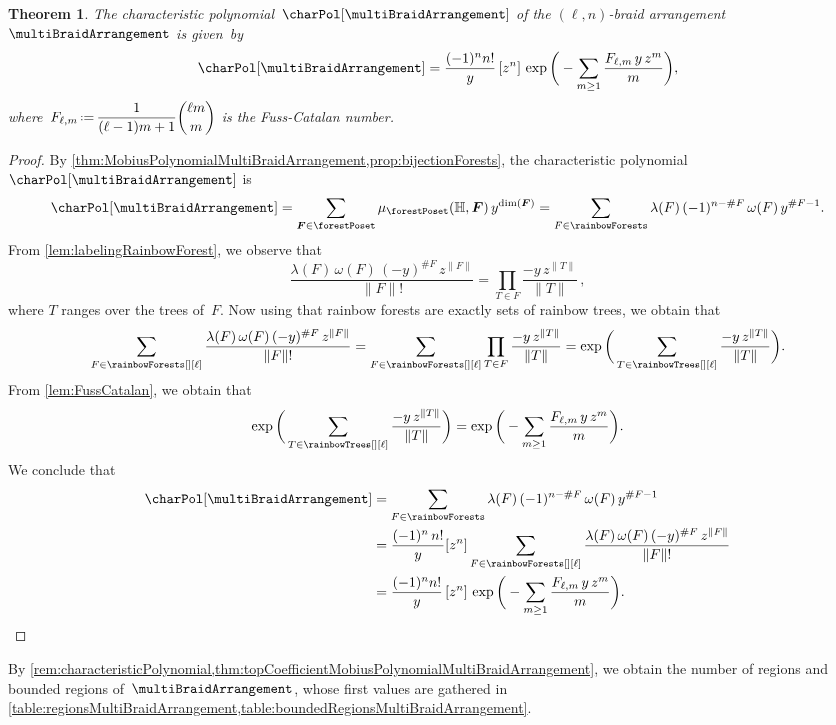 \documentclass{amsart}
\newtheorem{theorem}{Theorem}[section]
\theoremstyle{definition}
\renewcommand{\b}[1]{{\boldsymbol{#1}}} %
\newcommand{\eqdef}{\mbox{\,\raisebox{0.2ex}{\scriptsize\ensuremath{\mathrm:}}\ensuremath{=}\,}} %
\renewcommand{\b}[1]{\boldsymbol{#1}} %
\newcommand{\HH}{\mathbb{H}} %
\begin{document}
\begin{theorem}
\label{thm:topCoefficientMobiusPolynomialMultiBraidArrangement}
The characteristic polynomial~$\charPol[\multiBraidArrangement]$ of the $(\ell,n)$-braid arrangement~$\multiBraidArrangement$ is given~by
\[
\charPol[\multiBraidArrangement] = \frac{(-1)^n n!}{y} \, [z^n] \, \exp \bigg( - \sum_{m \ge 1} \frac{F_{\ell,m} \, y \, z^m}{m} \bigg) ,
\]
where~$\displaystyle F_{\ell,m} \eqdef \frac{1}{(\ell-1)m+1} \binom{\ell m}{m}$ is the Fuss-Catalan number.
\end{theorem}

\begin{proof}
By \cref{thm:MobiusPolynomialMultiBraidArrangement,prop:bijectionForests}, the characteristic polynomial~$\charPol[\multiBraidArrangement]$ is
\[
\charPol[\multiBraidArrangement] = \sum_{\b{F} \in \forestPoset} \mu_{\forestPoset}(\HH, \b{F}) \, y^{\dim(\b{F})} = \sum_{F \in \rainbowForests} \lambda(F) \, (-1)^{n-\#F} \, \omega(F) \, y^{\#F-1}.
\]
From \cref{lem:labelingRainbowForest}, we observe that
\[
\frac{\lambda(F) \, \omega(F) \, (-y)^{\#F} \, z^{\|F\|}}{\|F\|!} = \prod_{T \in F} \frac{-y \, z^{\|T\|}}{\|T\|} \, ,
\]
where $T$ ranges over the trees of~$F$.
Now using that rainbow forests are exactly sets of rainbow trees, we obtain that
\[
\sum_{F \in \rainbowForests[][\ell]} \frac{ \lambda(F) \, \omega(F) \, (-y)^{\#F} \, z^{\|F\|}}{\|F\|!} = \sum_{F \in \rainbowForests[][\ell]} \prod_{T \in F} \frac{-y \, z^{\|T\|}}{\|T\|} = \exp \bigg( \sum_{T \in \rainbowTrees[][\ell]} \frac{-y \, z^{\|T\|}}{\|T\|} \bigg).
\]
From \cref{lem:FussCatalan}, we obtain that
\[
\exp \bigg( \sum_{T \in \rainbowTrees[][\ell]} \frac{-y \, z^{\|T\|}}{\|T\|} \bigg) = \exp \bigg( - \sum_{m \ge 1} \frac{F_{\ell,m} \, y \, z^m}{m} \bigg).
\]
We conclude that
\begin{align*}
\charPol[\multiBraidArrangement] 
& = \sum_{F \in \rainbowForests}  \lambda(F) \, (-1)^{n-\#F} \, \omega(F) \, y^{\#F-1} \\
& = \frac{(-1)^n \, n!}{y} [z^n] \sum_{F \in \rainbowForests[][\ell]} \frac{ \lambda(F) \, \omega(F) \, (-y)^{\#F} \, z^{\|F\|}}{\|F\|!} \\
& = \frac{(-1)^n n!}{y} \, [z^n] \, \exp \bigg( - \sum_{m \ge 1} \frac{F_{\ell,m} \, y \, z^m}{m} \bigg).
\qedhere
\end{align*}
\end{proof}

By \cref{rem:characteristicPolynomial,thm:topCoefficientMobiusPolynomialMultiBraidArrangement}, we obtain the number of regions and bounded regions of~$\multiBraidArrangement$, whose first values are gathered in \cref{table:regionsMultiBraidArrangement,table:boundedRegionsMultiBraidArrangement}.
\end{document}
